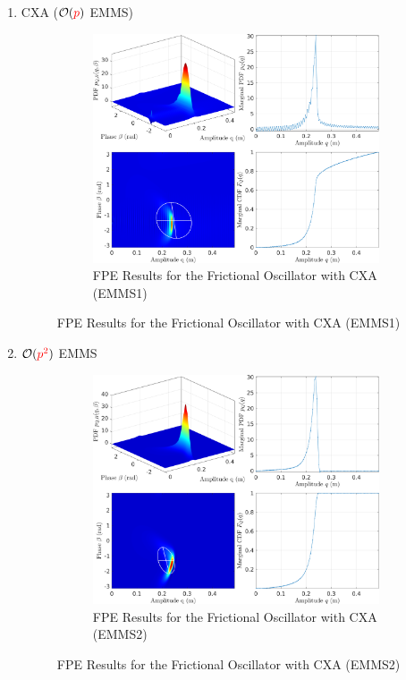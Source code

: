 \documentclass[11pt]{article}
\begin{document}
\begin{enumerate}
\begin{figure}
\begin{figure}[htbp]
\caption{FPE Results for the Frictional Oscillator with MMS2}
\end{figure}
\end{figure}
\item CXA (\(\mathcal{O}(\textcolor{red}{p})\) EMMS)
\label{sec:org44e78b1}
\begin{figure}
\begin{figure}[htbp]
\centering
\includegraphics[width=.9\linewidth]{FIGS/G3_SDOFFPE_jenkins_emms1.png}
\caption{FPE Results for the Frictional Oscillator with CXA (EMMS1)}
\end{figure}
\end{figure}
\item \(\mathcal{O}(\textcolor{red}{p^2})\) EMMS
\label{sec:org619cc79}
\begin{figure}
\begin{figure}[htbp]
\centering
\includegraphics[width=.9\linewidth]{FIGS/G3_SDOFFPE_jenkins_emms2.png}
\caption{FPE Results for the Frictional Oscillator with CXA (EMMS2)}
\end{figure}
\end{figure}
\end{enumerate}
\end{document}

